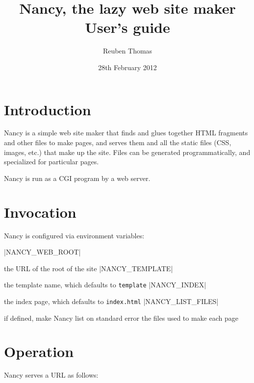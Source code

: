 \documentclass[english]{scrartcl}
\begin{document}
\title{Nancy, the lazy web site maker\\User’s guide}
\date{28th February 2012}
\author{Reuben Thomas}
\maketitle

\section{Introduction}

Nancy is a simple web site maker that finds and glues together HTML fragments and other files to make pages, and serves them and all the static files (CSS, images, etc.) that make up the site. Files can be generated programmatically, and specialized for particular pages.

Nancy is run as a CGI program by a web server.

\section{Invocation}

Nancy is configured via environment variables:

\begin{description}
|NANCY_WEB_ROOT|
\item[\UseVerb{webroot}]the URL of the root of the site
|NANCY_TEMPLATE|
\item[\UseVerb{template}]the template name, which defaults to \verb|template|
|NANCY_INDEX|
\item[\UseVerb{index}]the index page, which defaults to \verb|index.html|
|NANCY_LIST_FILES|
\item[\UseVerb{listfiles}]if defined, make Nancy list on standard error the files used to make each page
\end{description}

\section{Operation}
\label{operation}

Nancy serves a URL as follows:
\end{document}
